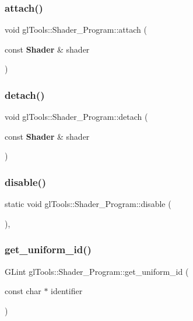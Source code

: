 \subsubsection{attach()}
{\footnotesize\ttfamily void gl\+Tools\+::\+Shader\+\_\+\+Program\+::attach (\begin{DoxyParamCaption}\item[{const \textbf{ Shader} \&}]{shader }\end{DoxyParamCaption})\hspace{0.3cm}{\ttfamily [inline]}}

\mbox{\label{classgl_tools_1_1_shader___program_ab1266cc47197f8c9af81faa3e0e1562d}} 
\subsubsection{detach()}
{\footnotesize\ttfamily void gl\+Tools\+::\+Shader\+\_\+\+Program\+::detach (\begin{DoxyParamCaption}\item[{const \textbf{ Shader} \&}]{shader }\end{DoxyParamCaption})\hspace{0.3cm}{\ttfamily [inline]}}

\mbox{\label{classgl_tools_1_1_shader___program_a4beb5f3d4148687dd868fff974c199e3}} 
\subsubsection{disable()}
{\footnotesize\ttfamily static void gl\+Tools\+::\+Shader\+\_\+\+Program\+::disable (\begin{DoxyParamCaption}{ }\end{DoxyParamCaption})\hspace{0.3cm}{\ttfamily [inline]}, {\ttfamily [static]}}

\mbox{\label{classgl_tools_1_1_shader___program_a47a074f920cc902db5c0af861dc6d2fc}} 
\subsubsection{get\_uniform\_id()}
{\footnotesize\ttfamily G\+Lint gl\+Tools\+::\+Shader\+\_\+\+Program\+::get\+\_\+uniform\+\_\+id (\begin{DoxyParamCaption}\item[{const char $\ast$}]{identifier }\end{DoxyParamCaption})\hspace{0.3cm}{\ttfamily [inline]}}

